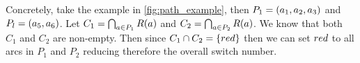 Concretely, take the example in \cref{fig:path_example}, then $P_1 = (a_1, a_2, a_3)$ and $P_l = (a_5, a_6)$. Let $C_1 = \bigcap_{a\in P_1} R(a)$ and $C_2 = \bigcap_{a\in P_2} R(a)$. We know that both $C_1$ and $C_2$ are non-empty. Then since $C_1 \cap C_2 = \{red\}$ then we can set $red$ to all arcs in $P_1$ and $P_2$ reducing therefore the overall switch number.